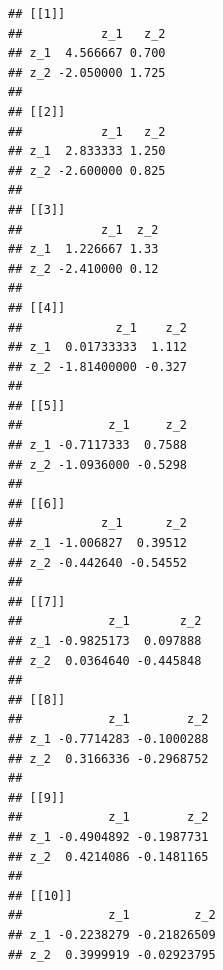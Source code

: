 \documentclass[12pt,a4paper]{article}
\newenvironment{Shaded}{\begin{snugshade}}{\end{snugshade}}
\newcommand{\CommentTok}[1]{\textcolor[rgb]{0.56,0.35,0.01}{\textit{#1}}}
\newcommand{\ControlFlowTok}[1]{\textcolor[rgb]{0.13,0.29,0.53}{\textbf{#1}}}
\newcommand{\DecValTok}[1]{\textcolor[rgb]{0.00,0.00,0.81}{#1}}
\newcommand{\KeywordTok}[1]{\textcolor[rgb]{0.13,0.29,0.53}{\textbf{#1}}}
\newcommand{\NormalTok}[1]{#1}
\newcommand{\OperatorTok}[1]{\textcolor[rgb]{0.81,0.36,0.00}{\textbf{#1}}}
\newcommand{\StringTok}[1]{\textcolor[rgb]{0.31,0.60,0.02}{#1}}
\begin{document}
\begin{Shaded}
\end{Shaded}

\begin{verbatim}
## [[1]]
##           z_1   z_2
## z_1  4.566667 0.700
## z_2 -2.050000 1.725
## 
## [[2]]
##           z_1   z_2
## z_1  2.833333 1.250
## z_2 -2.600000 0.825
## 
## [[3]]
##           z_1  z_2
## z_1  1.226667 1.33
## z_2 -2.410000 0.12
## 
## [[4]]
##             z_1    z_2
## z_1  0.01733333  1.112
## z_2 -1.81400000 -0.327
## 
## [[5]]
##            z_1     z_2
## z_1 -0.7117333  0.7588
## z_2 -1.0936000 -0.5298
## 
## [[6]]
##           z_1      z_2
## z_1 -1.006827  0.39512
## z_2 -0.442640 -0.54552
## 
## [[7]]
##            z_1       z_2
## z_1 -0.9825173  0.097888
## z_2  0.0364640 -0.445848
## 
## [[8]]
##            z_1        z_2
## z_1 -0.7714283 -0.1000288
## z_2  0.3166336 -0.2968752
## 
## [[9]]
##            z_1        z_2
## z_1 -0.4904892 -0.1987731
## z_2  0.4214086 -0.1481165
## 
## [[10]]
##            z_1         z_2
## z_1 -0.2238279 -0.21826509
## z_2  0.3999919 -0.02923795
\end{verbatim}
\end{document}
